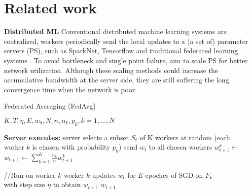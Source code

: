 \section{Related work}
\textbf{Distributed ML}
Conventional distributed machine learning systems are centralized, workers periodically send the local updates to a (a set of) parameter servers (PS), such as SparkNet\cite{moritz2016sparknet:}, Tensorflow\cite{abadi2016tensorflow:} and traditional federated learning systems \cite{konecny2015federated,konevcny2016federated}. To avoid bottleneck and single point failure, \cite{li2014scaling,mlsys2019towards} aim to scale PS for  better network utilization. Although these scaling methods could increase the accumulative bandwidth at the server side, they are still suffering the long convergence time when the network is poor.
\begin{algorithm}[!t]

\caption{Federated Averaging (FedAvg)}

\renewcommand{\algorithmicrequire}{\textbf{Input:}}
\renewcommand{\algorithmicensure}{\textbf{Output:}}

\begin{algorithmic}[1]
\REQUIRE $K, T, \eta, E, w_0, N, n, n_k, p_k,  k = 1,...,N $

\STATE \textbf{Server executes:}
    \STATE server selects a subset $S_t$ of K workers at random (each worker $k$ is chosen with probability $p_k$)
    \STATE send $w_t$ to all chosen workers
        \STATE $w^k_{t+1} \leftarrow$
    \ENDFOR
    \STATE $w_{t+1} \leftarrow \sum ^{K}_{k=1} \frac{n_k}{n}w^k_{t+1}$
\ENDFOR

\item[]

\STATE {}//Run on worker $k$
    {\STATE \quad worker $k$ updates $w_t$ for $E$ epoches of SGD on $F_k$ \\ \quad with step size $\eta$ to obtain $w_{t+1}$
\RETURN $w_{t+1}$ }


\end{algorithmic}	\label{Fedavg} 
\end{algorithm}


